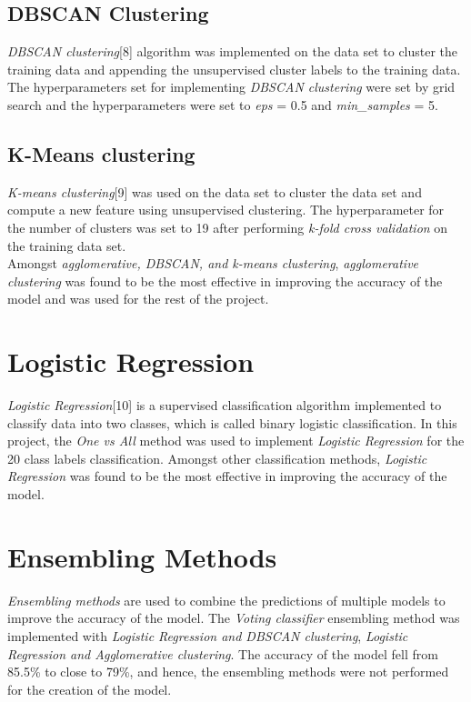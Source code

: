 \documentclass[conference]{IEEEtran}
\begin{document}
\subsection{DBSCAN Clustering}
    \textit{DBSCAN clustering}[8] algorithm was implemented on the data set to cluster the training data and appending the unsupervised cluster labels to the training data. The hyperparameters set for implementing \textit{DBSCAN clustering} were set by grid search and the hyperparameters were set to \textit{eps} = 0.5 and \textit{min\_samples} = 5.
\subsection{K-Means clustering}
    \textit{K-means clustering}[9] was used on the data set to cluster the data set and compute a new feature using unsupervised clustering. The hyperparameter for the number of clusters was set to 19 after performing \textit{k-fold cross validation} on the training data set. 
\\ Amongst \textit{agglomerative, DBSCAN, and k-means clustering}, \textit{agglomerative clustering} was found to be the most effective in improving the accuracy of the model and was used for the rest of the project.

\section{Logistic Regression} 
    \textit{Logistic Regression}[10]  is a supervised classification algorithm implemented to classify data into two classes, which is called binary logistic classification. In this project, the \textit{One vs All} method was used to implement \textit{Logistic Regression} for the 20 class labels classification. Amongst other classification methods, \textit{Logistic Regression} was found to be the most effective in improving the accuracy of the model.

\section{Ensembling Methods}
    \textit{Ensembling methods} are used to combine the predictions of multiple models to improve the accuracy of the model. 
    The \textit{Voting classifier} ensembling method was implemented with \textit{Logistic Regression and DBSCAN clustering}, \textit{Logistic Regression and Agglomerative clustering}. The accuracy of the model fell from 85.5\% to close to 79\%, and hence, the ensembling methods were not performed for the creation of the model. 
\end{document}
